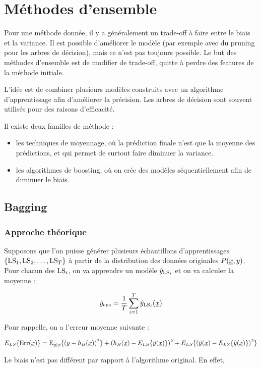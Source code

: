 \chapter{Méthodes d'ensemble}

Pour une méthode donnée, il y a généralement un trade-off à faire entre le biais et la variance. Il est possible d'améliorer le modèle (par exemple avec du pruning pour les arbres de décision), mais ce n'est pas toujours possible. Le but des méthodes d'ensemble est de modifier de trade-off, quitte à perdre des features de la méthode initiale.


L'idée est de combiner plusieurs modèles construits avec un algorithme d'apprentissage afin d'améliorer la précision. Les arbres de décision sont souvent utilisés pour des raisons d'efficacité.

Il existe deux familles de méthode :

\begin{itemize}
	\item les techniques de moyennage, où la prédiction finale n'est que la moyenne des prédictions, et qui permet de surtout faire diminuer la variance.
	\item les algorithmes de boosting, où on crée des modèles séquentiellement afin de diminuer le biais.
\end{itemize}

\section{Bagging}

	\subsection{Approche théorique}
	Supposons que l'on puisse générer plusieurs échantillons d'apprentissages $\lbrace \text{LS}_1, \text{LS}_2, \dots , \text{LS}_T \rbrace$ à partir de la distribution des données originales $P(\underline{x}, y)$. Pour chacun des $\text{LS}_i$, on va apprendre un modèle $\hat{y}_{\text{LS}_i}$ et on va calculer la moyenne :
	
	$$\hat{y}_{\text{ens}} = \frac{1}{T} \sum_{i = 1}^T \hat{y}_{\text{LS}_i}(\underline{x})$$
	
	Pour rappelle, on a l'erreur moyenne suivante :
	
	$$E_{LS}\{\text{Err}(\underline{x})\} = \text{E}_{y \vert \underline{x}} \lbrace (y - h_B(\underline{x}))^2 \rbrace + (h_B(\underline{x}) - E_{LS}\{\hat{y}(\underline{x})\})^2 + E_{LS}\{(\hat{y}(\underline{x}) - E_{LS}\{\hat{y}(\underline{x})\})^2\}$$
	
	Le biais n'est pas différent par rapport à l'algorithme original. En effet,
	
